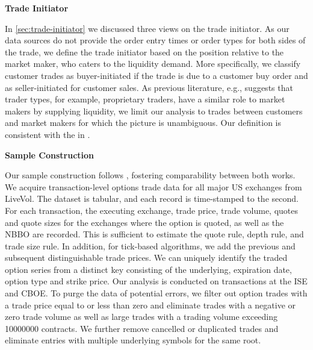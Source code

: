 \textbf{Trade Initiator}

In \cref{sec:trade-initiator} we discussed three views on the trade initiator. As our data sources do not provide the order entry times or order types for both sides of the trade, we define the trade initiator based on the position relative to the market maker, who caters to the liquidity demand. More specifically, we classify customer trades as buyer-initiated if the trade is due to a customer buy order and as seller-initiated for customer sales. As previous literature, e.g., \textcite[][4276]{garleanuDemandBasedOptionPricing2009} suggests that trader types, for example, proprietary traders, have a similar role to market makers by supplying liquidity, we limit our analysis to trades between customers and market makers for which the picture is unambiguous. Our definition is consistent with the in \textcite[][8]{grauerOptionTradeClassification2022}.

\textbf{Sample Construction}

Our sample construction follows \textcite[][7--9]{grauerOptionTradeClassification2022}, fostering comparability between both works. We acquire transaction-level options trade data for all major US exchanges from LiveVol. The dataset is tabular, and each record is time-stamped to the second. For each transaction, the executing exchange, trade price, trade volume, quotes and quote sizes for the exchanges where the option is quoted, as well as the \gls{NBBO} are recorded. This is sufficient to estimate the quote rule, depth rule, and trade size rule. In addition, for tick-based algorithms, we add the previous and subsequent distinguishable trade prices. We can uniquely identify the traded option series from a distinct key consisting of the underlying, expiration date, option type and strike price. Our analysis is conducted on transactions at the \gls{ISE} and \gls{CBOE}. To purge the data of potential errors, we filter out option trades with a trade price equal to or less than zero and eliminate trades with a negative or zero trade volume as well as large trades with a trading volume exceeding \num{10000000} contracts. We further remove cancelled or duplicated trades and eliminate entries with multiple underlying symbols for the same root.

